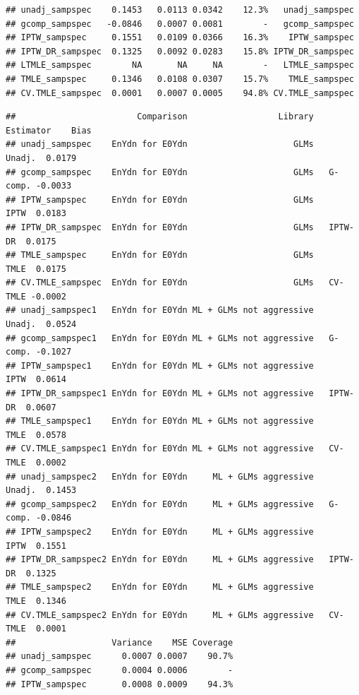 \documentclass[11pt]{article}\usepackage[]{graphicx}\usepackage[]{color}
\makeatletter
\newenvironment{kframe}{%
 \def\at@end@of@kframe{}%
 \ifinner\ifhmode%
  \def\at@end@of@kframe{\end{minipage}}%
  \begin{minipage}{\columnwidth}%
 \fi\fi%
 \def\FrameCommand##1{\hskip\@totalleftmargin \hskip-\fboxsep
 \colorbox{shadecolor}{##1}\hskip-\fboxsep
     \hskip-\linewidth \hskip-\@totalleftmargin \hskip\columnwidth}%
 \MakeFramed {\advance\hsize-\width
   \@totalleftmargin\z@ \linewidth\hsize
   \@setminipage}}%
 {\par\unskip\endMakeFramed%
 \at@end@of@kframe}
\newenvironment{knitrout}{}{} %
\makeatother
\begin{document}
\begin{knitrout}
\begin{kframe}
\begin{verbatim}
## unadj_sampspec    0.1453   0.0113 0.0342    12.3%   unadj_sampspec
## gcomp_sampspec   -0.0846   0.0007 0.0081        -   gcomp_sampspec
## IPTW_sampspec     0.1551   0.0109 0.0366    16.3%    IPTW_sampspec
## IPTW_DR_sampspec  0.1325   0.0092 0.0283    15.8% IPTW_DR_sampspec
## LTMLE_sampspec        NA       NA     NA        -   LTMLE_sampspec
## TMLE_sampspec     0.1346   0.0108 0.0307    15.7%    TMLE_sampspec
## CV.TMLE_sampspec  0.0001   0.0007 0.0005    94.8% CV.TMLE_sampspec
\end{verbatim}
\end{kframe}
\end{knitrout}

\begin{knitrout}
\color{fgcolor}\begin{kframe}
\begin{verbatim}
##                        Comparison                  Library Estimator    Bias
## unadj_sampspec    EnYdn for E0Ydn                     GLMs    Unadj.  0.0179
## gcomp_sampspec    EnYdn for E0Ydn                     GLMs   G-comp. -0.0033
## IPTW_sampspec     EnYdn for E0Ydn                     GLMs      IPTW  0.0183
## IPTW_DR_sampspec  EnYdn for E0Ydn                     GLMs   IPTW-DR  0.0175
## TMLE_sampspec     EnYdn for E0Ydn                     GLMs      TMLE  0.0175
## CV.TMLE_sampspec  EnYdn for E0Ydn                     GLMs   CV-TMLE -0.0002
## unadj_sampspec1   EnYdn for E0Ydn ML + GLMs not aggressive    Unadj.  0.0524
## gcomp_sampspec1   EnYdn for E0Ydn ML + GLMs not aggressive   G-comp. -0.1027
## IPTW_sampspec1    EnYdn for E0Ydn ML + GLMs not aggressive      IPTW  0.0614
## IPTW_DR_sampspec1 EnYdn for E0Ydn ML + GLMs not aggressive   IPTW-DR  0.0607
## TMLE_sampspec1    EnYdn for E0Ydn ML + GLMs not aggressive      TMLE  0.0578
## CV.TMLE_sampspec1 EnYdn for E0Ydn ML + GLMs not aggressive   CV-TMLE  0.0002
## unadj_sampspec2   EnYdn for E0Ydn     ML + GLMs aggressive    Unadj.  0.1453
## gcomp_sampspec2   EnYdn for E0Ydn     ML + GLMs aggressive   G-comp. -0.0846
## IPTW_sampspec2    EnYdn for E0Ydn     ML + GLMs aggressive      IPTW  0.1551
## IPTW_DR_sampspec2 EnYdn for E0Ydn     ML + GLMs aggressive   IPTW-DR  0.1325
## TMLE_sampspec2    EnYdn for E0Ydn     ML + GLMs aggressive      TMLE  0.1346
## CV.TMLE_sampspec2 EnYdn for E0Ydn     ML + GLMs aggressive   CV-TMLE  0.0001
##                   Variance    MSE Coverage
## unadj_sampspec      0.0007 0.0007    90.7%
## gcomp_sampspec      0.0004 0.0006        -
## IPTW_sampspec       0.0008 0.0009    94.3%

\end{verbatim}
\end{kframe}
\end{knitrout}
\end{document}
